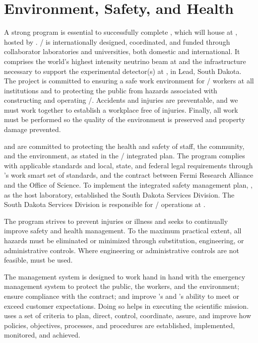 \chapter{Environment, Safety, and Health}
\label{vl:tc-ESH}


A strong  program is essential to successfully complete
, which will house  at \surf, hosted by
\fnal.  / is internationally designed,
coordinated, and funded through collaborator laboratories and
universities, both domestic and international.  It comprises the
world's highest intensity neutrino beam at \fnal and the
infrastructure necessary to support the experimental detector(s) at
\surf, in Lead, South Dakota.  The project is committed to ensuring a
safe work environment for / workers at all
institutions and to protecting the public from hazards associated with
constructing and operating /.  Accidents and
injuries are preventable, and we must work together to
establish a workplace free of injuries.  Finally, all work must be
performed so the quality of the environment is preserved
and property damage prevented.

\fnal and  are committed to protecting the health and
safety of staff, the community, and the environment, as stated in the
/ integrated  plan.  The
 program complies with applicable standards and local,
state, and federal legal requirements through \fnal's work smart set
of standards, and the contract between Fermi Research Alliance and the
 Office of Science.  To implement the integrated safety
management plan, \fnal, as the host laboratory, established the South
Dakota Services Division.  The South Dakota Services Division is
responsible for / operations at \surf.

The program strives to prevent injuries or illness and seeks to
continually improve safety and health management.  To the maximum
practical extent, all hazards must be eliminated or minimized through
substitution, engineering, or administrative controls.  Where
engineering or administrative controls are not feasible, 
must be used.

The  management system is designed to work hand in hand
with the emergency management system to protect the public, the
workers, and the environment; ensure compliance with the contract; and
improve \fnal's and 's ability to meet or exceed customer
expectations. Doing so helps in executing the scientific mission.
\fnal uses a set of criteria to plan, direct, control, coordinate,
assure, and improve how  policies, objectives, processes,
and procedures are established, implemented, monitored, and achieved.

